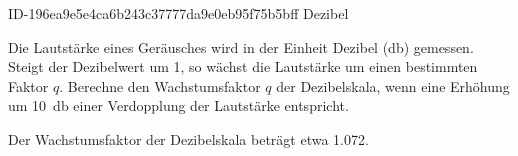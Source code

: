 \begin{exercise}
      {ID-196ea9e5e4ca6b243c37777da9e0eb95f75b5bff}
      {Dezibel}
  \ifproblem\problem\par
    Die Lautstärke eines Geräusches wird in der Einheit Dezibel (\si{\decibel})
    gemessen. Steigt der Dezibelwert um 1, so wächst die Lautstärke um einen
    bestimmten Faktor $q$. Berechne den Wachstumsfaktor $q$ der Dezibelskala,
    wenn eine Erhöhung um \SI{10}{\decibel} einer Verdopplung der Lautstärke
    entspricht.
  \fi
  \ifoutcome\outcome\par
    Der Wachstumsfaktor der Dezibelskala beträgt etwa \num{1.072}.
  \fi
\end{exercise}
